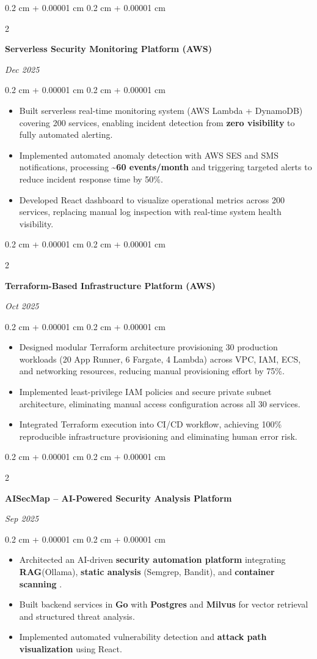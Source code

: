 \documentclass[10pt, letterpaper]{article}
\newenvironment{highlights}{
    \begin{itemize}[
        topsep=0.10 cm,
        parsep=0.10 cm,
        partopsep=0pt,
        itemsep=0pt,
        leftmargin=0.4 cm + 10pt
    ]
}{
    \end{itemize}
} %
\newenvironment{onecolentry}{
    \begin{adjustwidth}{
        0.2 cm + 0.00001 cm
    }{
        0.2 cm + 0.00001 cm
    }
}{
    \end{adjustwidth}
} %
\newenvironment{twocolentry}[2][]{
    \onecolentry
    \def\secondColumn{#2}
    \setcolumnwidth{\fill, 4.5 cm}
    \begin{paracol}{2}
}{
    \switchcolumn \raggedleft \secondColumn
    \end{paracol}
    \endonecolentry
} %
\begin{document}
\begin{twocolentry}{\textit{Dec 2025}}
\textbf{Serverless Security Monitoring Platform (AWS)}
\end{twocolentry}

\begin{onecolentry}
\begin{highlights}
    \item Built serverless real-time monitoring system (AWS Lambda + DynamoDB) covering 200 services, enabling incident detection from \textbf{zero visibility} to fully automated alerting.
    \item Implemented automated anomaly detection with AWS SES and SMS notifications, processing \textbf{\textasciitilde{}60 events/month} and triggering targeted alerts to reduce incident response time by 50\%.
    \item Developed React dashboard to visualize operational metrics across 200 services, replacing manual log inspection with real-time system health visibility.
\end{highlights}
\end{onecolentry}

\begin{twocolentry}{\textit{Oct 2025}}
\textbf{Terraform-Based Infrastructure Platform (AWS)}
\end{twocolentry}

\begin{onecolentry}
\begin{highlights}
    \item Designed modular Terraform architecture provisioning 30 production workloads (20 App Runner, 6 Fargate, 4 Lambda) across VPC, IAM, ECS, and networking resources, reducing manual provisioning effort by 75\%.
\item Implemented least-privilege IAM policies and secure private subnet architecture, eliminating manual access configuration across all 30 services.
\item Integrated Terraform execution into CI/CD workflow, achieving 100\% reproducible infrastructure provisioning and eliminating human error risk.
\end{highlights}
\end{onecolentry}
\begin{twocolentry}{\textit{Sep 2025}}
\textbf{AISecMap – AI-Powered Security Analysis Platform}
\end{twocolentry}

\begin{onecolentry}
\begin{highlights}
\item Architected an AI-driven \textbf{security automation platform} integrating \textbf{RAG}(Ollama), \textbf{static analysis} (Semgrep, Bandit), and \textbf{container scanning} .
\item Built backend services in \textbf{Go} with \textbf{Postgres} and \textbf{Milvus} for vector retrieval and structured threat analysis.
\item Implemented automated vulnerability detection and \textbf{attack path visualization} using React.

\end{highlights}
\end{onecolentry}
\end{document}
